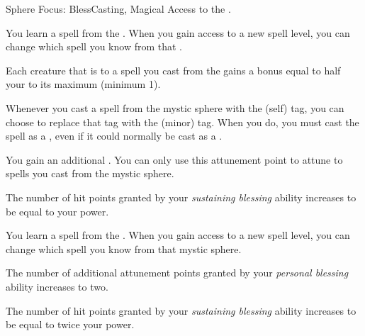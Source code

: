     \begin{feat}{Sphere Focus: Bless}{Casting, Magical}
        \featpre Access to the  .

         You learn a spell from the  .
        When you gain access to a new spell level, you can change which spell you know from that .

         Each creature that is  to a spell you cast from the   gains a bonus equal to half your  to its maximum  (minimum 1).

         Whenever you cast a spell from the  mystic sphere with the  (self) tag, you can choose to replace that tag with the  (minor) tag.
        When you do, you must cast the spell as a , even if it could normally be cast as a .

         You gain an additional .
        You can only use this attunement point to attune to spells you cast from the  mystic sphere.

         The number of hit points granted by your \textit{sustaining blessing} ability increases to be equal to your power.

         You learn a spell from the  .
        When you gain access to a new spell level, you can change which spell you know from that mystic sphere.

         The number of additional attunement points granted by your \textit{personal blessing} ability increases to two.

         The number of hit points granted by your \textit{sustaining blessing} ability increases to be equal to twice your power.
    \end{feat}

